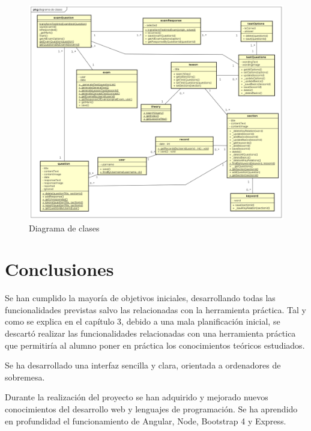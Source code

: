 \documentclass[openright,twoside,10pt]{book}
\begin{document}
    \begin{figure}[H]
        \begin{center}
            \includegraphics[width=\textwidth, angle=-90]{img/astah/disenio/clases/clases.png}
        \end{center}
        \caption{Diagrama de clases}
    \end{figure}
    
    \vspace*{\fill} \newpage
    
    \chapter{ Conclusiones }
    
    Se han cumplido la mayoría de objetivos iniciales, desarrollando todas
    las funcionalidades previstas salvo las relacionadas con la herramienta
    práctica. Tal y como se explica en el capítulo 3, debido a una mala
    planificación inicial, se descartó realizar las funcionalidades
    relacionadas con una herramienta práctica que permitiría al alumno poner
    en práctica los conocimientos teóricos estudiados.
    
    Se ha desarrollado una interfaz sencilla y clara, orientada a
    ordenadores de sobremesa.
    
    Durante la realización del proyecto se han adquirido y mejorado nuevos
    conocimientos del desarrollo web y lenguajes de programación. Se ha
    aprendido en profundidad el funcionamiento de Angular, Node, Bootstrap 4
    y Express.
    
\end{document}
